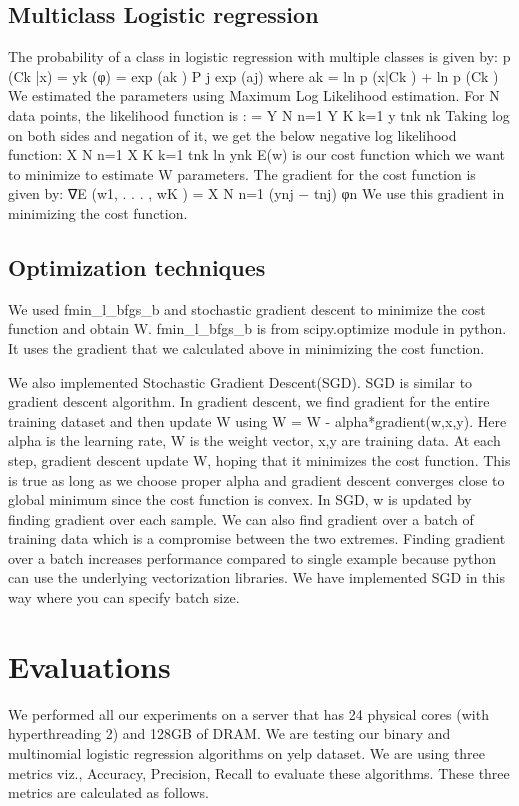 \documentclass{article}
\begin{document}
\subsection{Multiclass Logistic regression}
The probability of a class in logistic regression with multiple classes is given by:
p (Ck |x) = yk (φ) = exp (ak ) P j exp (aj) where ak = ln p (x|Ck ) + ln p (Ck )
We estimated the parameters using Maximum Log Likelihood estimation. For N data points, the likelihood function is : 
= Y N n=1 Y K k=1 y tnk nk
Taking log on both sides and negation of it, we get the below negative log likelihood function:
X N n=1 X K k=1 tnk ln ynk
E(w) is our cost function which we want to minimize to estimate W parameters. The gradient for the cost function is given by:
∇E (w1, . . . , wK ) = X N n=1 (ynj − tnj) φn
We use this gradient in minimizing the cost function.

\subsection{Optimization techniques}
We used fmin\_l\_bfgs\_b and stochastic gradient descent to minimize the cost function and obtain W. fmin\_l\_bfgs\_b is from scipy.optimize module in python. It uses the gradient that we calculated above in minimizing the cost function.

We also implemented Stochastic Gradient Descent(SGD). SGD is similar to gradient descent algorithm. In gradient descent, we find gradient for the entire training dataset and then update W using W = W - alpha*gradient(w,x,y). Here alpha is the learning rate, W is the weight vector, x,y are training data. At each step, gradient descent update W, hoping that it minimizes the cost function. This is true as long as we choose proper alpha and gradient descent converges close to global minimum since the cost function is convex. In SGD, w is updated by finding gradient over each sample. We can also find gradient over a batch of training data which is a compromise between the two extremes. Finding gradient over a batch increases performance compared to single example because python can use the underlying vectorization libraries. We have implemented SGD in this way where you can specify batch size.

\section{Evaluations}

We performed all our experiments on a server that has 24 physical cores (with hyperthreading 2) and 128GB of DRAM. We are testing our binary and multinomial logistic regression algorithms on yelp dataset. We are using three metrics viz., Accuracy, Precision, Recall to evaluate these algorithms. These three metrics are calculated as follows.
\end{document}

